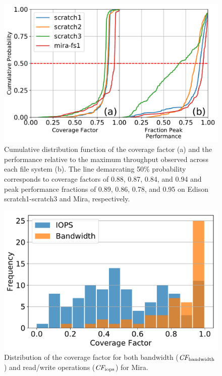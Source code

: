\begin{figure}[t]
    \centering
    \includegraphics[width=\columnwidth]{figs/cdf-both.pdf}
    \caption{Cumulative distribution function of the coverage factor (a) and the    performance relative to the maximum throughput observed across each file system (b).
    The line demarcating 50\% probability corresponds to coverage factors of 0.88, 0.87, 0.84, and 0.94 and peak performance fractions of 0.89, 0.86, 0.78, and 0.95 on Edison scratch1-scratch3 and Mira, respectively.}
    \label{fig:cdfs}
\end{figure}

\begin{figure}[t]
    \centering
    \includegraphics[width=\columnwidth]{figs/hist-cf-bw-and-ops.pdf}
    \caption{Distribution of the coverage factor for both bandwidth ($\textit{CF}_{\textup{bandwidth}}$) and read/write operations ($\textit{CF}_{\textup{iops}}$) for Mira.
    }
    \label{fig:hist-cf-mira}
\end{figure}

